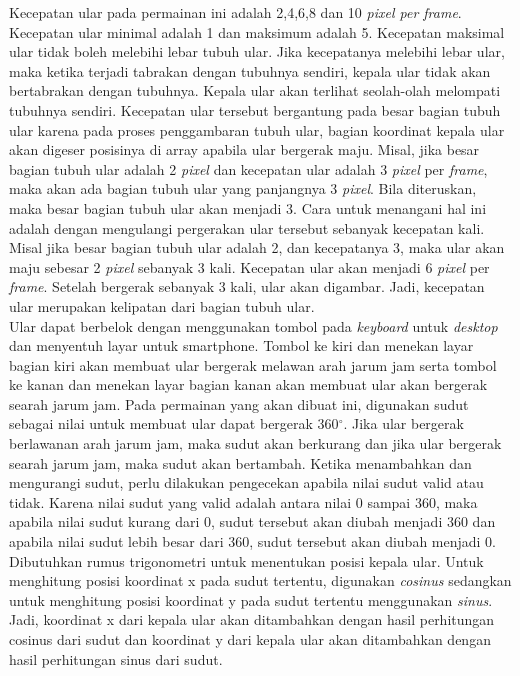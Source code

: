 Kecepatan ular pada permainan ini adalah 2,4,6,8 dan 10 \textit{pixel per frame}. Kecepatan ular minimal adalah 1 dan maksimum adalah 5. Kecepatan maksimal ular tidak boleh melebihi lebar tubuh ular. Jika kecepatanya melebihi lebar ular, maka ketika terjadi tabrakan dengan tubuhnya sendiri, kepala ular tidak akan bertabrakan dengan tubuhnya. Kepala ular akan terlihat seolah-olah melompati tubuhnya sendiri. Kecepatan ular tersebut bergantung pada besar bagian tubuh ular karena pada proses penggambaran tubuh ular, bagian koordinat kepala ular akan digeser posisinya di array apabila ular bergerak maju. Misal, jika besar bagian tubuh ular adalah 2 \textit{pixel} dan kecepatan ular adalah 3 \textit{pixel} per \textit{frame}, maka akan ada bagian tubuh ular yang panjangnya 3 \textit{pixel}. Bila diteruskan, maka besar bagian tubuh ular akan menjadi 3. Cara untuk menangani hal ini adalah dengan mengulangi pergerakan ular tersebut sebanyak kecepatan kali. Misal jika besar bagian tubuh ular adalah 2, dan kecepatanya 3, maka ular akan maju sebesar 2 \textit{pixel} sebanyak 3 kali. Kecepatan ular akan menjadi 6 \textit{pixel} per \textit{frame}. Setelah bergerak sebanyak 3 kali, ular akan digambar. Jadi, kecepatan ular merupakan kelipatan dari bagian tubuh ular. \\

Ular dapat berbelok dengan menggunakan tombol pada \textit{keyboard} untuk \textit{desktop} dan menyentuh layar untuk smartphone. Tombol ke kiri dan menekan layar bagian kiri akan membuat ular bergerak melawan arah jarum jam serta tombol ke kanan dan menekan layar bagian kanan akan membuat ular akan bergerak searah jarum jam. Pada permainan yang akan dibuat ini, digunakan sudut sebagai nilai untuk membuat ular dapat bergerak 360$^\circ$. Jika ular bergerak berlawanan arah jarum jam, maka sudut akan berkurang dan jika ular bergerak searah jarum jam, maka sudut akan bertambah. Ketika menambahkan dan mengurangi sudut, perlu dilakukan pengecekan apabila nilai sudut valid atau tidak. Karena nilai sudut yang valid adalah antara nilai 0 sampai 360, maka apabila nilai sudut kurang dari 0, sudut tersebut akan diubah menjadi 360 dan apabila nilai sudut lebih besar dari 360, sudut tersebut akan diubah menjadi 0. Dibutuhkan rumus trigonometri untuk menentukan posisi kepala ular. Untuk menghitung posisi koordinat x pada sudut tertentu, digunakan \textit{cosinus} sedangkan untuk menghitung posisi koordinat y pada sudut tertentu menggunakan \textit{sinus}. Jadi, koordinat x dari kepala ular akan ditambahkan dengan hasil perhitungan cosinus dari sudut dan koordinat y dari kepala ular akan ditambahkan dengan hasil perhitungan sinus dari sudut.


